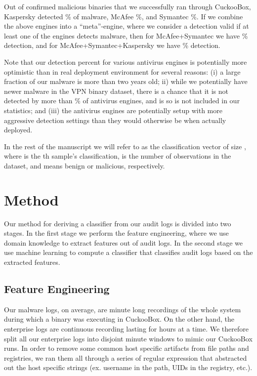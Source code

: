 \documentclass{sig-alternate-2013}
\newcommand{\etc}{etc.\xspace}
\begin{document}
Out of  confirmed malicious binaries that we successfully ran through CuckooBox, Kaspersky detected \% of malware, McAfee \%, and Symantec \%. If we combine the above engines into a ``meta''-engine, where we consider a detection valid if at least one of the engines detects malware, then for McAfee+Symantec we have \% detection, and for McAfee+Symantec+Kaspersky we have \% detection.

Note that our detection percent for various antivirus engines is potentially more optimistic than in real deployment environment for several reasons: (i) a large fraction of our malware is more than two years old; ii) while we potentially have newer malware in the VPN binary dataset, there is a chance that it is not detected by more than  \% of antivirus engines, and is so is not included in our statistics; and (iii) the antivirus engines are potentially setup with more aggressive detection settings than they would otherwise be when actually deployed.

In the rest of the manuscript we will refer to  as the classification vector of size , where  is the th sample's classification,   is the number of observations in the dataset, and  means benign or malicious, respectively.

\section{Method}
\label{sec:method}

Our method for deriving a classifier from our audit logs is divided into two stages. In the first stage we perform the feature engineering, where we use domain knowledge to extract features out of audit logs. In the second stage we use machine learning to compute a classifier that classifies audit logs based on the extracted features.

\subsection{Feature Engineering}

Our malware logs, on average, are  minute long recordings of the whole system during which a binary was executing in CuckooBox. On the other hand, the enterprise logs are continuous recording lasting for hours at a time. We therefore split all our enterprise logs into disjoint  minute windows to mimic our CuckooBox runs. In order to remove some common host specific artifacts from file paths and registries, we ran them all through a series of regular expression that abstracted out the host specific strings (ex. username in the path, UIDs in the registry, \etc).
\end{document}
